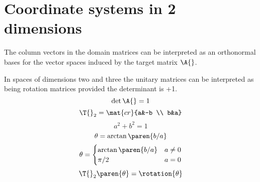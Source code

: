\section[2D coordinate systems]{Coordinate systems in 2 dimensions}

The column vectors in the domain matrices can be interpreted as an orthonormal bases for the vector spaces induced by the target matrix $\A{}$.

In spaces of dimensions two and three the unitary matrices can be interpreted as being rotation matrices provided the determinant is +1.
%
\begin{equation}
  \det \A{} = 1
\end{equation}
%
\begin{equation}
  \T{}_{2} = \mat{cr}{a&-b \\ b&a}
\end{equation}
%
\begin{equation}
  a^{2} + b^{2} = 1
\end{equation}
\begin{equation}
  \theta = \arctan \paren{b/a} 
\end{equation}
%
\begin{equation}
  \theta =
  \begin{cases}
    \arctan \paren{b/a} & a \ne 0 \\
    \pi / 2 & a = 0
  \end{cases}
\end{equation}
%
\begin{equation}
  \T{}_{2} \paren{\theta} = \rotation{\theta}
\end{equation}


\endinput